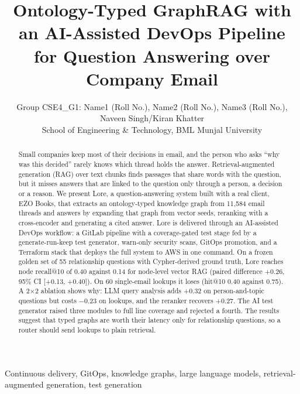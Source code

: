 \documentclass[12pt,onecolumn,draftclsnofoot]{IEEEtran}
\begin{document}
\title{Ontology-Typed GraphRAG with an AI-Assisted DevOps Pipeline for Question Answering over Company Email}

\author{Group CSE4\_G1: Name1 (Roll No.), Name2 (Roll No.), Name3 (Roll No.), Naveen Singh/Kiran Khatter\\
School of Engineering \& Technology, BML Munjal University}

\maketitle

\begin{abstract}
Small companies keep most of their decisions in email, and the person who asks ``why was this decided'' rarely knows which thread holds the answer. Retrieval-augmented generation (RAG) over text chunks finds passages that share words with the question, but it misses answers that are linked to the question only through a person, a decision or a reason. We present Lore, a question-answering system built with a real client, EZO Books, that extracts an ontology-typed knowledge graph from 11,584 email threads and answers by expanding that graph from vector seeds, reranking with a cross-encoder and generating a cited answer. Lore is delivered through an AI-assisted DevOps workflow: a GitLab pipeline with a coverage-gated test stage fed by a generate-run-keep test generator, warn-only security scans, GitOps promotion, and a Terraform stack that deploys the full system to AWS in one command. On a frozen golden set of 55 relationship questions with Cypher-derived ground truth, Lore reaches node recall@10 of 0.40 against 0.14 for node-level vector RAG (paired difference +0.26, 95\% CI [+0.13, +0.40]). On 60 single-email lookups it loses (hit@10 0.40 against 0.75). A 2$\times$2 ablation shows why: LLM query analysis adds +0.32 on person-and-topic questions but costs $-0.23$ on lookups, and the reranker recovers +0.27. The AI test generator raised three modules to full line coverage and rejected a fourth. The results suggest that typed graphs are worth their latency only for relationship questions, so a router should send lookups to plain retrieval.
\end{abstract}

\begin{IEEEkeywords}
Continuous delivery, GitOps, knowledge graphs, large language models, retrieval-augmented generation, test generation
\end{IEEEkeywords}
\end{document}
